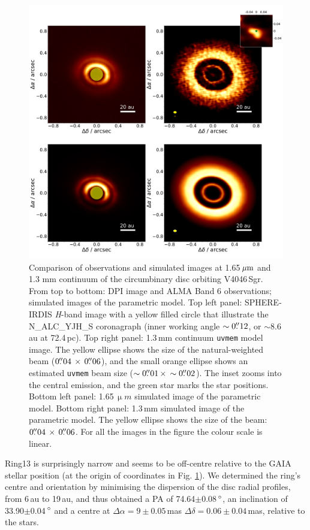 \documentclass[letters,usenatbib,times]{mnras}
\begin{document}
\begin{figure}
  \includegraphics[width=\textwidth]{hot_two_E.pdf}
  \caption{Comparison of observations and simulated images at 1.65\,$\hbox{$\mu$m}$ and 1.3 mm continuum of the circumbinary disc orbiting V4046\,Sgr. From top to bottom: DPI image and ALMA Band 6 observations; simulated images of the parametric model. Top left panel: SPHERE-IRDIS \textit{H}-band image with a yellow filled circle that illustrate the N\_ALC\_YJH\_S coronagraph (inner working angle $\sim0\hbox{$.\!\!^{\prime\prime}$}12$, or $\sim$8.6\,au at 72.4\,pc). Top right panel: 1.3\,mm continuum {\tt uvmem} model image. The yellow ellipse shows the size of the natural-weighted beam ($ 0\hbox{$.\!\!^{\prime\prime}$}04 \, \times \, 0\hbox{$.\!\!^{\prime\prime}$}06$), and the small orange ellipse shows an estimated {\tt uvmem} beam size ($\sim0\hbox{$.\!\!^{\prime\prime}$}01 \, \times \, \sim0\hbox{$.\!\!^{\prime\prime}$}02$). The inset zooms into the central emission, and the green star marks the star positions. Bottom left panel: 1.65\,$\upmu m$ simulated image of the parametric model. Bottom right panel: 1.3\,mm simulated image of the parametric model. The yellow ellipse shows the size of the beam: $0\hbox{$.\!\!^{\prime\prime}$}04 \, \times \, 0\hbox{$.\!\!^{\prime\prime}$}06$. For all the images in the figure the colour scale is linear.}
  \label{fig:two}
\end{figure}

Ring13 is surprisingly narrow and seems to be off-centre relative to the GAIA stellar position (at the origin of coordinates in Fig. \ref{fig:two}). We determined the ring's centre and orientation by minimising the dispersion of the disc radial profiles, from 6\,au to 19\,au, and thus obtained a PA of 74.64$\pm$0.08\,$\hbox{$^\circ$}$, an inclination of 33.90$\pm$0.04\,$\hbox{$^\circ$}$ and a centre at $\Delta \alpha = 9\pm0.05$\,mas $\Delta \delta = 0.06\pm0.04$\,mas, relative to the stars.
\end{document}
